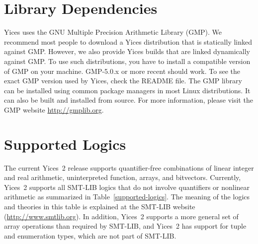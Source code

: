 \documentclass[11pt,twoside,fleqn,openright,titlepage]{cslreport}
\begin{document}
\section{Library Dependencies}

Yices  uses the GNU  Multiple Precision  Arithmetic Library  (GMP). We
recommend  most  people  to  download  a Yices  distribution  that  is
statically linked  against GMP. However, we also  provide Yices builds
that are  linked dynamically against  GMP. To use  such distributions,
you   have  to   install  a   compatible  version   of  GMP   on  your
machine. GMP-5.0.x  or more recent should  work. To see  the exact GMP
version used by  Yices, check the README file. The  GMP library can be
installed    using   common   package    managers   in    most   Linux
distributions. It  can also  be built and  installed from  source. For
more     information,     please     visit     the     GMP     website
\url{http://gmplib.org}.


\section{Supported Logics}

The current  Yices~2 release supports quantifier-free  combinations of
linear integer  and real  arithmetic, uninterpreted  function, arrays,
and bitvectors. Currently, Yices~2 supports all SMT-LIB logics that do
not  involve  quantifiers or  nonlinear  arithmetic  as summarized  in
Table~\ref{supported-logics}.  The meaning of  the logics and theories
in    this   table    is    explained   at    the   SMT-LIB    website
(\url{http://www.smtlib.org}).  In  addition, Yices~2 supports  a more
general set of array operations  than required by SMT-LIB, and Yices~2
has support  for tuple and  enumeration types,  which are not  part of
SMT-LIB.
\end{document}
